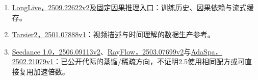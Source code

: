 \begin{enumerate}
\item
  \href{https://arxiv.org/abs/2509.22622v2}{LongLive，2509.22622v2}及\href{https://github.com/NVlabs/LongLive/blob/31c70d9071cd7851d82939806dc9fac645fcabe5/LongLive1.0/pipeline/causal_inference.py}{固定因果推理入口}：训练历史、因果依赖与流式缓存。
\item
  \href{https://arxiv.org/abs/2501.07888v1}{Tarsier2，2501.07888v1}：视频描述与时间理解的数据生产参考。
\item
  \href{https://arxiv.org/abs/2506.09113v2}{Seedance 1.0，2506.09113v2}、\href{https://arxiv.org/abs/2503.07699v2}{RayFlow，2503.07699v2}与\href{https://arxiv.org/abs/2502.21079v1}{AdaSpa，2502.21079v1}：已公开代际的蒸馏/稀疏方向，不证明2.5使用相同配方或可直接复用加速倍数。
\end{enumerate}
